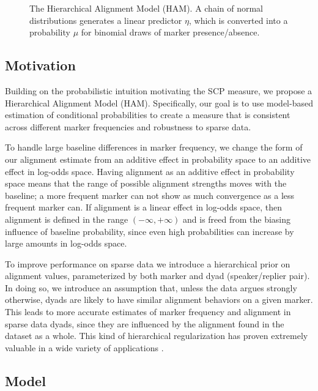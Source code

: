 \documentclass{acm_proc_article-sp}
\begin{document}
\begin{figure}[t]
  \begin{center}
    
  \end{center}
  \caption{The Hierarchical Alignment Model (HAM). A chain of normal distributions generates a linear predictor $\eta$, which is converted into a probability $\mu$ for binomial draws of marker presence/absence.}\label{fig:model}
\end{figure}

\subsection{Motivation}

Building on the probabilistic intuition motivating the SCP measure, we propose a Hierarchical Alignment Model (HAM). Specifically, our goal is to use model-based estimation of conditional probabilities to create a measure that is consistent across different marker frequencies and robustness to sparse data.  

To handle large baseline differences in marker frequency, we change the form of our alignment estimate from an additive effect in probability space to an additive effect in log-odds space. Having alignment as an additive effect in probability space means that the range of possible alignment strengths moves with the baseline; a more frequent marker can not show as much convergence as a less frequent marker can. If alignment is a linear effect in log-odds space, then alignment is defined in the range $(-\infty,+\infty)$ and is freed from the biasing influence of baseline probability, since even high probabilities can increase by large amounts in log-odds space.

To improve performance on sparse data we introduce a hierarchical prior on alignment values, parameterized by both marker and dyad (speaker/replier pair). In doing so, we introduce an assumption that, unless the data argues strongly otherwise, dyads are likely to have similar alignment behaviors on a given marker. This leads to more accurate estimates of marker frequency and alignment in sparse data dyads, since they are influenced by the alignment found in the dataset as a whole. This kind of hierarchical regularization has proven extremely valuable in a wide variety of applications \cite{gelman2006}.  

\subsection{Model}
\end{document}
